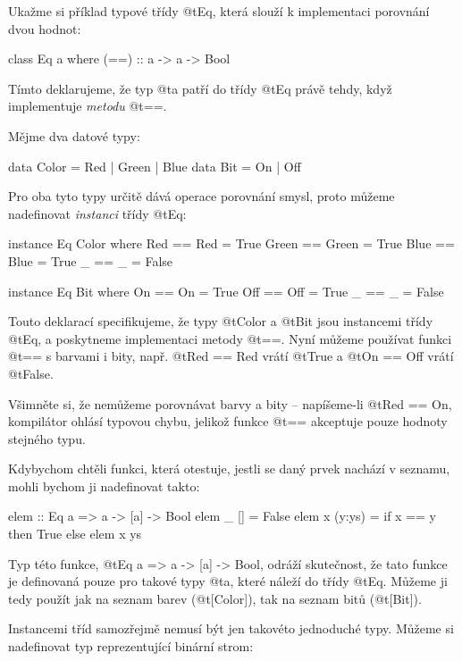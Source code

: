 Ukažme si příklad typové třídy @t{Eq}, která slouží k implementaci porovnání
dvou hodnot:

\begin{haskell}
class Eq a where
  (==) :: a -> a -> Bool
\end{haskell}

Tímto deklarujeme, že typ @t{a} patří do třídy @t{Eq} právě tehdy, když
implementuje \emph{metodu} @t{==}.

Mějme dva datové typy:

\begin{haskell}
data Color = Red | Green | Blue
data Bit = On | Off
\end{haskell}

Pro oba tyto typy určitě dává operace porovnání smysl, proto můžeme nadefinovat
\emph{instanci} třídy @t{Eq}:

\begin{haskell}
instance Eq Color where
  Red   == Red   = True
  Green == Green = True
  Blue  == Blue  = True
  _     == _     = False

instance Eq Bit where
  On  == On  = True
  Off == Off = True
  _   == _   = False
\end{haskell}

Touto deklarací specifikujeme, že typy @t{Color} a @t{Bit} jsou instancemi třídy @t{Eq}, a
poskytneme implementaci metody @t{==}. Nyní můžeme používat funkci @t{==} s
barvami i bity, např. @t{Red == Red} vrátí @t{True} a @t{On == Off} vrátí
@t{False}.

Všimněte si, že nemůžeme porovnávat barvy a bity -- napíšeme-li @t{Red == On},
kompilátor ohlásí typovou chybu, jelikož funkce @t{==} akceptuje pouze hodnoty
stejného typu.

Kdybychom chtěli funkci, která otestuje, jestli se daný prvek nachází v
seznamu, mohli bychom ji nadefinovat takto:

\begin{haskell}
elem :: Eq a => a -> [a] -> Bool
elem _ [] = False
elem x (y:ys) = if x == y then True else elem x ys
\end{haskell}

Typ této funkce, @t{Eq a => a -> [a] -> Bool}, odráží skutečnost, že tato funkce
je definovaná pouze pro takové typy @t{a}, které náleží do třídy @t{Eq}. Můžeme
ji tedy použít jak na seznam barev (@t{[Color]}), tak na seznam bitů
(@t{[Bit]}).

Instancemi tříd samozřejmě nemusí být jen takovéto jednoduché typy.  Můžeme si
nadefinovat typ reprezentující binární strom:

